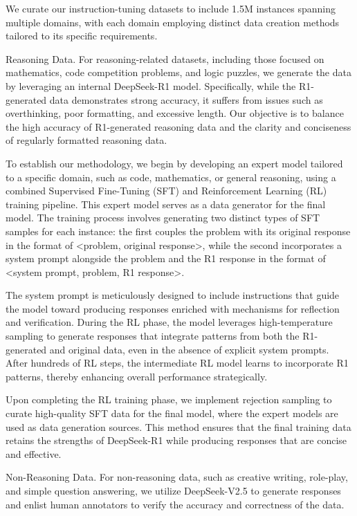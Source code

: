 \documentclass[11pt,a4paper]{article}
\begin{document}
We curate our instruction-tuning datasets to include 1.5M instances spanning multiple domains, with each domain employing distinct data creation methods tailored to its specific requirements.

Reasoning Data. For reasoning-related datasets, including those focused on mathematics, code competition problems, and logic puzzles, we generate the data by leveraging an internal DeepSeek-R1 model. Specifically, while the R1-generated data demonstrates strong accuracy, it suffers from issues such as overthinking, poor formatting, and excessive length. Our objective is to balance the high accuracy of R1-generated reasoning data and the clarity and conciseness of regularly formatted reasoning data.

To establish our methodology, we begin by developing an expert model tailored to a specific domain, such as code, mathematics, or general reasoning, using a combined Supervised Fine-Tuning (SFT) and Reinforcement Learning (RL) training pipeline. This expert model serves as a data generator for the final model. The training process involves generating two distinct types of SFT samples for each instance: the first couples the problem with its original response in the format of <problem, original response>, while the second incorporates a system prompt alongside the problem and the R1 response in the format of <system prompt, problem, R1 response>.

The system prompt is meticulously designed to include instructions that guide the model toward producing responses enriched with mechanisms for reflection and verification. During the RL phase, the model leverages high-temperature sampling to generate responses that integrate patterns from both the R1-generated and original data, even in the absence of explicit system prompts. After hundreds of RL steps, the intermediate RL model learns to incorporate R1 patterns, thereby enhancing overall performance strategically.

Upon completing the RL training phase, we implement rejection sampling to curate high-quality SFT data for the final model, where the expert models are used as data generation sources. This method ensures that the final training data retains the strengths of DeepSeek-R1 while producing responses that are concise and effective.

Non-Reasoning Data. For non-reasoning data, such as creative writing, role-play, and simple question answering, we utilize DeepSeek-V2.5 to generate responses and enlist human annotators to verify the accuracy and correctness of the data.
\end{document}

